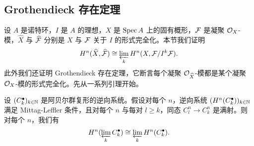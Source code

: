 \subsection{Grothendieck 存在定理}\label{sec:2.7}

设 $A$ 是诺特环，$I$ 是 $A$ 的理想，$X$ 是 $\operatorname{Spec} A$ 上的固有概形，$\mathcal{F}$ 是凝聚 $\mathcal{O}_X$-模，$\widehat{X}$ 与 $\widehat{\mathcal{F}}$ 分别是 $X$ 与 $\mathcal{F}$ 关于 $I$ 的形式完全化。本节我们证明
\begin{equation*}
H^n(\widehat{X},\widehat{\mathcal{F}})\cong\varprojlim_k H^n(X,\mathcal{F}/I^k\mathcal{F}).
\end{equation*}
此外我们还证明 Grothendieck 存在定理，它断言每个凝聚 $\mathcal{O}_{\widehat{X}}$-模都是某个凝聚 $\mathcal{O}_X$-模的形式完全化。先从一系列引理开始。

\begin{lemma}\label{it:2.7.1}
设 $(C_k^{\bullet})_{k\in\mathbb{N}}$ 是阿贝尔群复形的逆向系统。假设对每个 $n$，逆向系统 $(H^n(C_k^{\bullet}))_{k\in\mathbb{N}}$ 满足 Mittag-Leffler 条件，且对每个 $n$ 与每对 $l\ge k$，同态 $C_l^n\to C_k^n$ 是满射。则对每个 $n$，我们有
\begin{equation*}
H^n(\varprojlim_k C_k^{\bullet})\cong\varprojlim_k H^n(C_k^{\bullet}).
\end{equation*}
\end{lemma}

